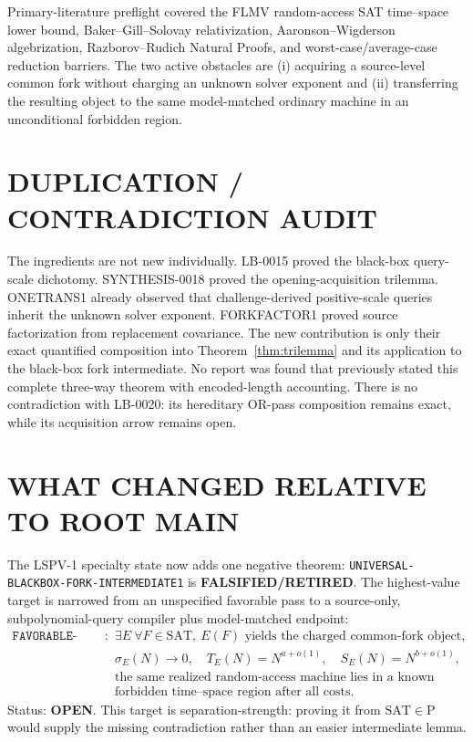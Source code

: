 \documentclass[11pt]{article}
\newcommand{\SAT}{\mathrm{SAT}}
\begin{document}
Primary-literature preflight covered the FLMV random-access SAT time--space
lower bound, Baker--Gill--Solovay relativization, Aaronson--Wigderson
algebrization, Razborov--Rudich Natural Proofs, and worst-case/average-case
reduction barriers.  The two active obstacles are (i) acquiring a
source-level common fork without charging an unknown solver exponent and
(ii) transferring the resulting object to the same model-matched ordinary
machine in an unconditional forbidden region.

\section{DUPLICATION / CONTRADICTION AUDIT}

The ingredients are not new individually.  LB-0015 proved the black-box
query-scale dichotomy.  SYNTHESIS-0018 proved the opening-acquisition
trilemma.  ONETRANS1 already observed that challenge-derived positive-scale
queries inherit the unknown solver exponent.  FORKFACTOR1 proved source
factorization from replacement covariance.  The new contribution is only
their exact quantified composition into Theorem~\ref{thm:trilemma} and its
application to the black-box fork intermediate.  No report was found that
previously stated this complete three-way theorem with encoded-length
accounting.  There is no contradiction with LB-0020: its hereditary OR-pass
composition remains exact, while its acquisition arrow remains open.

\section{WHAT CHANGED RELATIVE TO ROOT MAIN}

The LSPV-1 specialty state now adds one negative theorem:
\texttt{UNIVERSAL-BLACKBOX-FORK-INTERMEDIATE1} is
\textbf{FALSIFIED/RETIRED}.  The highest-value target is narrowed from an
unspecified favorable pass to a source-only, subpolynomial-query compiler
plus model-matched endpoint:
\[
\begin{split}
\texttt{FAVORABLE-SOURCE-FORK-ENDPOINT1}:\quad
&\exists E\ \forall F\in\mathrm{SAT},\
E(F)\text{ yields the charged common-fork object},\\
&\sigma_E(N)\to0,\quad
T_E(N)=N^{a+o(1)},\quad S_E(N)=N^{b+o(1)},\\
&\text{the same realized random-access machine lies in a known}\\
&\text{forbidden time--space region after all costs.}
\end{split}
\]
Status: \textbf{OPEN}.  This target is separation-strength: proving it from
$\SAT\in\mathrm P$ would supply the missing contradiction rather than an
easier intermediate lemma.
\end{document}
